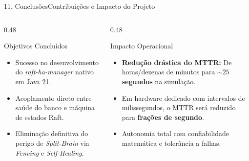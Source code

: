 \documentclass[aspectratio=169,10pt]{beamer}
\begin{document}
\begin{frame}{11. Conclusões}{Contribuições e Impacto do Projeto}
  \begin{columns}[t]
    \begin{column}{0.48\textwidth}
      \begin{block}{Objetivos Concluídos}
        \begin{itemize}
          \item Sucesso no desenvolvimento do \textit{raft-ha-manager} nativo em Java 21.
          \item Acoplamento direto entre saúde do banco e máquina de estados Raft.
          \item Eliminação definitiva do perigo de \textit{Split-Brain} via \textit{Fencing} e \textit{Self-Healing}.
        \end{itemize}
      \end{block}
    \end{column}
    \begin{column}{0.48\textwidth}
      \begin{exampleblock}{Impacto Operacional}
        \begin{itemize}
          \item \textbf{Redução drástica do MTTR:} De horas/dezenas de minutos para \textbf{$\sim 25$ segundos} na simulação.
          \item Em hardware dedicado com intervalos de milissegundos, o MTTR será reduzido para \textbf{frações de segundo}.
          \item Autonomia total com confiabilidade matemática e tolerância a falhas.
        \end{itemize}
      \end{exampleblock}
    \end{column}
  \end{columns}
\end{frame}
\end{document}
